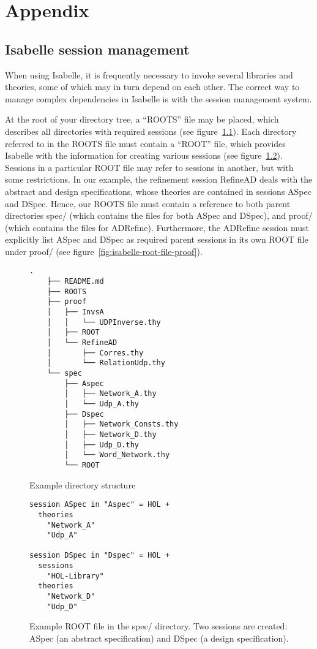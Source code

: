 \documentclass[twoside]{memoir}
\begin{document}
\chapter{Appendix}
\section{Isabelle session management}
When using Isabelle, it is frequently necessary to invoke several libraries and theories,
some of which may in turn depend on each other.
The correct way to manage complex dependencies in Isabelle is with the session management system.

At the root of your directory tree, a ``ROOTS'' file may be placed, which describes all directories with required sessions (see figure~\ref{fig:isabelle-roots-file}).
Each directory referred to in the ROOTS file must contain a ``ROOT'' file, which provides Isabelle with the information for creating various sessions
(see figure~\ref{fig:isabelle-root-file-spec}).
Sessions in a particular ROOT file may refer to sessions in another, but with some restrictions.
In our example, the refinement session RefineAD deals with the abstract and design specifications, whose theories are contained in sessions
ASpec and DSpec.
Hence, our ROOTS file must contain a reference to both parent directories spec/ (which contains the files for both ASpec and DSpec), and proof/
(which contains the files for ADRefine).
Furthermore, the ADRefine session must explicitly list ASpec and DSpec as required parent sessions in its own ROOT file under proof/ (see figure~\ref{fig:isabelle-root-file-proof}).

\begin{figure}[htpb]
    \centering
    \begin{lstlisting}[style=tree, language=file]
    .
    ├── README.md
    ├── ROOTS
    ├── proof
    │   ├── InvsA
    │   │   └── UDPInverse.thy
    │   ├── ROOT
    │   └── RefineAD
    │       ├── Corres.thy
    │       └── RelationUdp.thy
    └── spec
        ├── Aspec
        │   ├── Network_A.thy
        │   └── Udp_A.thy
        ├── Dspec
        │   ├── Network_Consts.thy
        │   ├── Network_D.thy
        │   ├── Udp_D.thy
        │   └── Word_Network.thy
        └── ROOT
    \end{lstlisting}
    
    \caption{Example directory structure}
    \label{fig:isabelle-roots-file}
\end{figure}

\begin{figure}[htpb]
    \centering
    \begin{lstlisting}[language=isabelle]
session ASpec in "Aspec" = HOL +
  theories
    "Network_A"
    "Udp_A"

session DSpec in "Dspec" = HOL +
  sessions
    "HOL-Library"
  theories
    "Network_D"
    "Udp_D"
    \end{lstlisting}
    
    \caption{Example ROOT file in the spec/ directory. Two sessions are created: ASpec (an abstract specification) and DSpec (a design specification).}
    \label{fig:isabelle-root-file-spec}
\end{figure}
\end{document}
